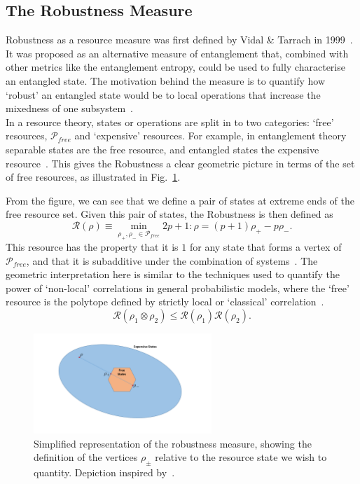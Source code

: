 \documentclass{standalone}
\begin{document}
\subsection{The Robustness Measure}\label{sec:robustnessmeasure}
Robustness as a resource measure was first defined by Vidal \& Tarrach in 1999~\cite{Vidal1999}. It was proposed as an alternative measure of entanglement that, combined with other metrics like the entanglement entropy, could be used to fully characterise an entangled state. The motivation behind the measure is to quantify how `robust' an entangled state would be to local operations that increase the mixedness of one subsystem~\cite{Vidal1999}.\\
In a resource theory, states or operations are split in to two categories: `free' resources, $\mathcal{P}_{free}$ and `expensive' resources. For example, in entanglement theory separable states are the free resource, and entangled states the expensive resource~\cite{Vidal1999}. This gives the Robustness a clear geometric picture in terms of the set of free resources, as illustrated in Fig.~\ref{fig:robustshapes}.
\par
From the figure, we can see that we define a pair of states at extreme ends of the free resource set. Given this pair of states, the Robustness is then defined as~\cite{Vidal1999}
\begin{equation}\label{eq:robustness}
    \mathcal{R}(\rho)\equiv\min_{\rho_{+},\rho_{-}\in\mathcal{P}_{free}} 2p+1 : \rho = \left(p+1\right)\rho_{+} - p\rho_{-}.
\end{equation}
This resource has the property that it is $1$ for any state that forms a vertex of $\mathcal{P}_{free}$, and that it is subadditive under the combination of systems~\cite{Vidal1999,Howard2016}. The geometric interpretation here is similar to the techniques used to quantify the power of `non-local' correlations in general probabilistic models, where the `free' resource is the polytope defined by strictly local or `classical' correlation~\cite{Acin2006}.
\[\mathcal{R}(\rho_{1}\otimes\rho_{2})\leq \mathcal{R}(\rho_{1})\mathcal{R}(\rho_{2}).\]
\par
\begin{figure}[h]
    \centering
    \includegraphics[width=0.6\textwidth]{Figures/Robustness.pdf}
    \caption{Simplified representation of the robustness measure, showing the definition of the vertices $\rho_{\pm}$ relative to the resource state we wish to quantity. Depiction inspired by~\cite{Vidal1999,Howard2016}.}
\label{fig:robustshapes}
\end{figure}
\end{document}
